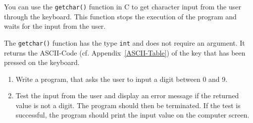 \begin{exercise}
You can use the  {\tt getchar()} function in C to
get character input from the user through the keyboard.
This function stops the execution of the program and waits
for the input from the user. 

The {\tt getchar()} function has the type {\tt int} and does
not require an argument. It returns the ASCII-Code (cf. Appendix~\ref{ASCII-Table})
of the key that has been pressed on the keyboard.
\begin{enumerate}
\item Write a program, that asks the user 
to input a digit between  0 and 9. 

\item Test the input from the user and display an error message 
if the returned value is not a digit. The program should then
be terminated.
If the test is successful, the program should print the 
input value on the computer screen.
\end{enumerate}


\end{exercise}













